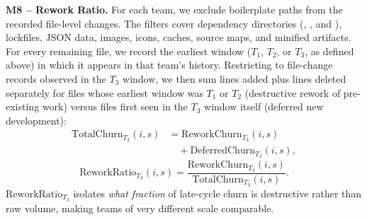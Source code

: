 \documentclass[conference]{IEEEtran}
\begin{document}
\textbf{M8 -- Rework Ratio.} For each team, we exclude boilerplate paths from
the recorded file-level changes. The filters cover dependency directories
(, , and ), lockfiles, JSON data,
images, icons, caches, source maps, and minified artifacts. For every
remaining file, we record the earliest window ($T_1$, $T_2$, or $T_3$, as
defined above) in which it appears in that team's history. Restricting to
file-change records observed in the $T_3$ window, we then sum lines added
plus lines deleted separately for files whose earliest window was $T_1$ or
$T_2$ (destructive rework of pre-existing work) versus files first seen in
the $T_3$ window itself (deferred new development):
\[
\begin{aligned}
\mathrm{TotalChurn}_{T_3}(i,s)
  &= \mathrm{ReworkChurn}_{T_3}(i,s) \\
  &\quad + \mathrm{DeferredChurn}_{T_3}(i,s),
\end{aligned}
\]
\[
\mathrm{ReworkRatio}_{T_3}(i,s) = \frac{\mathrm{ReworkChurn}_{T_3}(i,s)}{\mathrm{TotalChurn}_{T_3}(i,s)}.
\]
$\mathrm{ReworkRatio}_{T_3}$ isolates \emph{what fraction} of late-cycle churn
is destructive rather than raw volume, making teams of very different scale
comparable.
\end{document}

